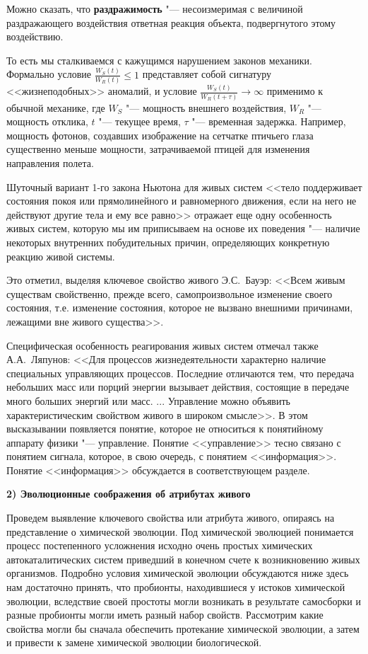 \documentclass[12pt,a4paper,oneside]{book}
\begin{document}
Можно сказать, что \textbf{раздражимость} "--- несоизмеримая с величиной раздражающего воздействия ответная реакция объекта, подвергнутого этому воздействию.

То есть мы сталкиваемся с кажущимся нарушением законов механики. Формально условие $\frac {W_S (t)} {W_R (t)} \leq 1$ представляет собой сигнатуру <<жизнеподобных>> аномалий, и условие $\frac {W_S (t)} {W_R (t+ \tau)} \rightarrow \infty$ применимо к обычной механике, где $W_S$ "--- мощность внешнего воздействия, $W_R$ "--- мощность отклика, $t$ "--- текущее время, $\tau$ "--- временная задержка. Например, мощность фотонов, создавших изображение на сетчатке птичьего глаза существенно меньше мощности, затрачиваемой птицей для изменения направления полета.

Шуточный вариант 1-го закона Ньютона для живых систем <<тело поддерживает состояния покоя или прямолинейного и равномерного движения, если на него не действуют другие тела и ему все равно>> отражает еще одну особенность живых систем, которую мы им приписываем на основе их поведения "--- наличие некоторых внутренних побудительных причин, определяющих конкретную реакцию живой системы.

Это отметил, выделяя ключевое свойство живого Э.С.~Бауэр: <<Всем живым существам свойственно, прежде всего, самопроизвольное изменение своего состояния, т.е. изменение состояния, которое не вызвано внешними причинами, лежащими вне живого существа>>.

Специфическая особенность реагирования живых систем отмечал также А.А.~Ляпунов: <<Для процессов жизнедеятельности характерно наличие специальных управляющих процессов. Последние отличаются тем, что передача небольших масс или порций энергии вызывает действия, состоящие в передаче много больших энергий или масс. ... Управление можно объявить характеристическим свойством живого в широком смысле>>. В этом высказывании появляется понятие, которое не относиться к понятийному аппарату физики "--- управление. Понятие <<управление>> тесно связано с понятием сигнала, которое, в свою очередь, с понятием <<информация>>. Понятие <<информация>> обсуждается в соответствующем разделе.

\textbf{2) Эволюционные соображения об атрибутах живого}

Проведем выявление ключевого свойства или атрибута живого, опираясь на представление о химической эволюции. Под химической эволюцией понимается процесс постепенного усложнения исходно очень простых химических автокаталитических систем приведший в конечном счете к возникновению живых организмов. Подробно условия химической эволюции обсуждаются ниже здесь нам достаточно принять, что пробионты, находившиеся у истоков химической эволюции, вследствие своей простоты могли возникать в результате самосборки и разные пробионты могли иметь разный набор свойств. Рассмотрим какие свойства могли бы сначала обеспечить протекание химической эволюции, а затем и привести к замене химической эволюции биологической. 
\end{document}
